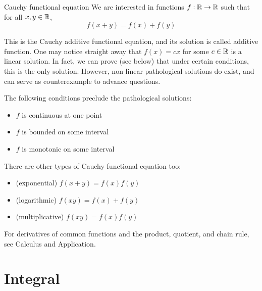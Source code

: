 \documentclass[11pt]{article}
\begin{document}
\begin{extension}{Cauchy functional equation}
  We are interested in functions \(f:\mathbb{R}\to\mathbb{R}\) such that for all \(x,y\in\mathbb{R}\),
  \[f(x+y)=f(x)+f(y)\]

  This is the Cauchy additive functional equation, and its solution is called additive function. One may notice straight away that \(f(x)=cx\) for some \(c\in\mathbb{R}\) is a linear solution. In fact, we can prove (see below) that under certain conditions, this is the only solution. However, non-linear pathological solutions do exist, and can serve as counterexample to advance questions.

  The following conditions preclude the pathological solutions:
  \begin{itemize}
    \item \(f\) is continuous at one point
    \item \(f\) is bounded on some interval
    \item \(f\) is monotonic on some interval
  \end{itemize}

  There are other types of Cauchy functional equation too:
  \begin{itemize}
    \item (exponential) \(f(x+y)=f(x)f(y)\)
    \item (logarithmic) \(f(xy)=f(x)+f(y)\)
    \item (multiplicative) \(f(xy)=f(x)f(y)\)
  \end{itemize}
\end{extension}

For derivatives of common functions and the product, quotient, and chain rule, see Calculus and Application. 

\section{Integral}
\end{document}

